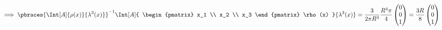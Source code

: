 \begin{solution}
\begin{enumerate}
\end{enumerate}

\begin{align*}
    \implies
    \pbraces
    {
        \Int[A]{\rho(x)}{\lambda^3(x)}
    }^{-1}
    \Int[A]
    {
        \begin{pmatrix}
            x_1 \\ x_2 \\ x_3
        \end{pmatrix}
        \rho(x)
    }{\lambda^3(x)}
    =
    \frac{3}{2 \pi R^3}
    \frac{R^4 \pi}{4}
    \begin{pmatrix}
        0 \\ 0 \\ 1
    \end{pmatrix}
    =
    \frac{3 R}{8}
    \begin{pmatrix}
        0 \\ 0 \\ 1
    \end{pmatrix}
\end{align*}

\end{solution}

